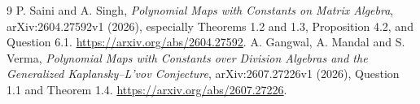 \documentclass[11pt]{article}
\theoremstyle{remark}\newtheorem{remark}[theorem]{Remark}
\begin{document}
\begin{thebibliography}{9}
 P. Saini and A. Singh,
\emph{Polynomial Maps with Constants on Matrix Algebra},
arXiv:2604.27592v1 (2026), especially Theorems 1.2 and 1.3, Proposition 4.2, and Question 6.1.
\url{https://arxiv.org/abs/2604.27592}.
 A. Gangwal, A. Mandal and S. Verma,
\emph{Polynomial Maps with Constants over Division Algebras and the Generalized Kaplansky--L'vov Conjecture},
arXiv:2607.27226v1 (2026), Question 1.1 and Theorem 1.4.
\url{https://arxiv.org/abs/2607.27226}.
\end{thebibliography}
\end{document}
